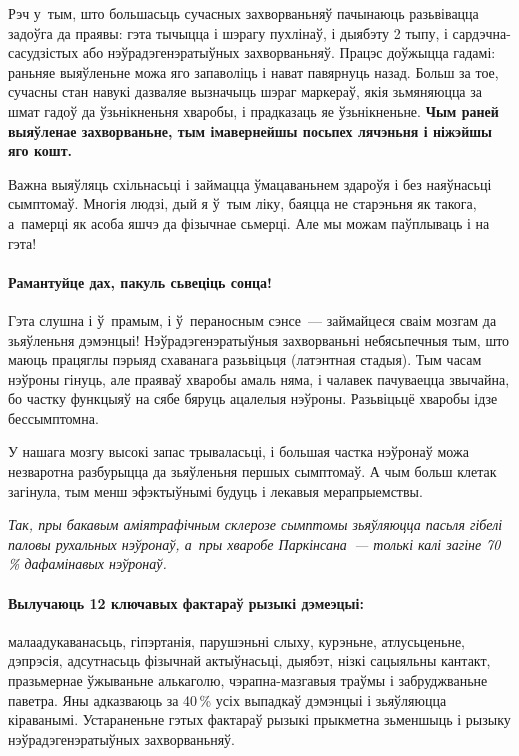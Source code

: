 Рэч у~тым, што большасьць сучасных захворваньняў пачынаюць разьвівацца задоўга да праявы: гэта тычыцца і шэрагу пухлінаў, і дыябэту 2 тыпу, і сардэчна-сасудзістых або нэўрадэгенэратыўных захворваньняў. Працэс доўжыцца гадамі: раньняе выяўленьне можа яго запаволіць і нават павярнуць назад. Больш за тое, сучасны стан навукі дазваляе вызначыць шэраг маркераў, якія зьмяняюцца за шмат гадоў да ўзьнікненьня хваробы, і прадказаць яе ўзьнікненьне. \textbf{Чым раней выяўленае захворваньне, тым імавернейшы посьпех лячэньня і ніжэйшы яго кошт.}

Важна выяўляць схільнасьці і займацца ўмацаваньнем здароўя і без наяўнасьці сымптомаў. Многія людзі, дый я ў~тым ліку, баяцца не старэньня як такога, а~памерці як асоба яшчэ да фізычнае сьмерці. Але мы можам паўплываць і на гэта!

\paragraph{Рамантуйце дах, пакуль сьвеціць сонца!} Гэта слушна і ў~прамым, і ў~пераносным сэнсе~--- займайцеся сваім мозгам да зьяўленьня дэмэнцыі! Нэўрадэгенэратыўныя захворваньні небясьпечныя тым, што маюць працяглы пэрыяд схаванага разьвіцьця (латэнтная стадыя). Тым часам нэўроны гінуць, але праяваў хваробы амаль няма, і чалавек пачуваецца звычайна, бо частку функцыяў на сябе бяруць ацалелыя нэўроны. Разьвіцьцё хваробы ідзе бессымптомна.

У нашага мозгу высокі запас трываласьці, і большая частка нэўронаў можа незваротна разбурыцца да зьяўленьня першых сымптомаў. А чым больш клетак загінула, тым менш эфэктыўнымі будуць і лекавыя мерапрыемствы. 

\emph{Так, пры бакавым аміятрафічным склерозе сымптомы зьяўляюцца пасьля гібелі паловы рухальных нэўронаў, а~пры хваробе Паркінсана~--- толькі калі загіне 70\,\% дафамінавых нэўронаў.}

\paragraph{Вылучаюць 12 ключавых фактараў рызыкі дэмеэцыі:} малаадукаванасьць, гіпэртанія, парушэньні слыху, курэньне, атлусьценьне, дэпрэсія, адсутнасьць фізычнай актыўнасьці, дыябэт, нізкі сацыяльны кантакт, празьмернае ўжываньне алькаголю, чэрапна-мазгавыя траўмы і забруджваньне паветра. Яны адказваюць за 40\,\% усіх выпадкаў дэмэнцыі і зьяўляюцца кіраванымі. Устараненьне гэтых фактараў рызыкі прыкметна зьменшыць і рызыку нэўрадэгенэратыўных захворваньняў.


